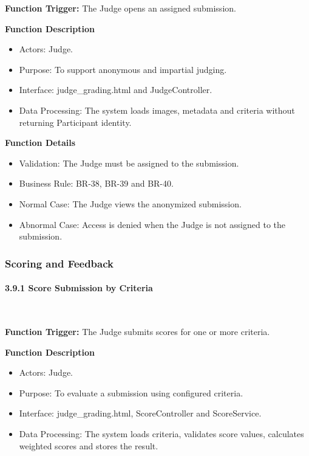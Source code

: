 \textbf{Function Trigger:} The Judge opens an assigned submission.

\textbf{Function Description}
\begin{itemize}[leftmargin=1.5em, nosep]
    \item Actors: Judge.
    \item Purpose: To support anonymous and impartial judging.
    \item Interface: judge\_grading.html and JudgeController.
    \item Data Processing: The system loads images, metadata and criteria without returning Participant identity.
\end{itemize}

\textbf{Function Details}
\begin{itemize}[leftmargin=1.5em, nosep]
    \item Validation: The Judge must be assigned to the submission.
    \item Business Rule: BR-38, BR-39 and BR-40.
    \item Normal Case: The Judge views the anonymized submission.
    \item Abnormal Case: Access is denied when the Judge is not assigned to the submission.
\end{itemize}

\subsubsection{Scoring and Feedback}
\label{subsubsec:scoring-feedback}

\paragraph*{3.9.1 Score Submission by Criteria}\leavevmode\\[-0.5em]
\label{par:score-submission-by-criteria}

\textbf{Function Trigger:} The Judge submits scores for one or more criteria.

\textbf{Function Description}
\begin{itemize}[leftmargin=1.5em, nosep]
    \item Actors: Judge.
    \item Purpose: To evaluate a submission using configured criteria.
    \item Interface: judge\_grading.html, ScoreController and ScoreService.
    \item Data Processing: The system loads criteria, validates score values, calculates weighted scores and stores the result.
\end{itemize}

